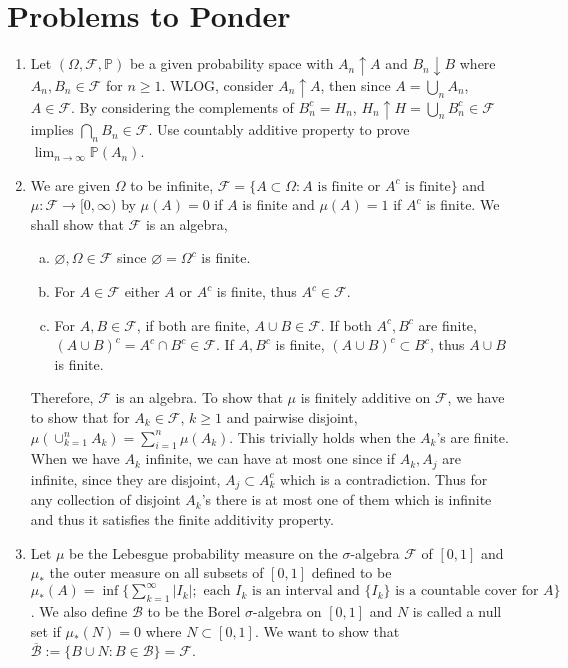 \documentclass[a4paper,10pt]{article}
\theoremstyle{definition}
\begin{document}
\section*{Problems to Ponder}

\begin{enumerate}
\item Let $(\Omega, \mathcal{F}, \mathbb{P})$ be a given probability space with $A_n \uparrow A$ and $B_n \downarrow B$ where $A_n, B_n \in \mathcal{F}$ for $n \geq 1$. WLOG, consider $A_n \uparrow A$, then since $A = \bigcup_nA_n$, $A \in \mathcal{F}$. By considering the complements of $B_n^c = H_n$, $H_n \uparrow H = \bigcup_n B_n^c \in \mathcal{F}$ implies $\bigcap_nB_n \in \mathcal{F}$. Use countably additive property to prove $\lim_{n\to\infty}\mathbb{P}(A_n)$. 

\item We are given $\Omega$ to be infinite, $\mathcal{F} = \{A \subset \Omega: A \text{ is finite or } A^c \text{ is finite}\}$ and $\mu: \mathcal{F}\to [0,\infty)$ by $\mu(A)=0$ if $A$ is finite and $\mu(A) = 1$ if $A^c$ is finite. We shall show that $\mathcal{F}$ is an algebra,
\begin{enumerate}[(a)]
\item $\varnothing, \Omega \in \mathcal{F}$ since $\varnothing = \Omega^c$ is finite. 
\item For $A \in \mathcal{F}$ either $A$ or $A^c$ is finite, thus $A^c \in \mathcal{F}$.
\item For $A, B \in \mathcal{F}$, if both are finite, $A \cup B \in \mathcal{F}$. If both $A^c, B^c$ are finite, $(A \cup B)^c = A^c \cap B^c \in \mathcal{F}$. If $A, B^c$ is finite, $(A \cup B)^c \subset B^c$, thus $A \cup B$ is finite.
\end{enumerate}
Therefore, $\mathcal{F}$ is an algebra. To show that $\mu$ is finitely additive on $\mathcal{F}$, we have to show that for $A_k \in \mathcal{F}$, $k \geq 1$ and pairwise disjoint, $\mu(\cup_{k=1}^nA_k) = \sum_{i=1}^n\mu(A_k)$. This trivially holds when the $A_k$'s are finite. When we have $A_k$ infinite, we can have at most one since if $A_k, A_j$ are infinite, since they are disjoint, $A_j \subset A_k^c$ which is a contradiction. Thus for any collection of disjoint $A_k$'s there is at most one of them which is infinite and thus it satisfies the finite additivity property.

\item Let $\mu$ be the Lebesgue probability measure on the $\sigma$-algebra $\mathcal{F}$ of $[0,1]$ and $\mu_\ast$ the outer measure on all subsets of $[0,1]$ defined to be $\mu_\ast(A)=\inf \{\sum_{k=1}^{\infty}|I_k|; \text{ each }I_k \text{ is an interval and }\{I_k\} \text{ is a countable cover for } A\}$. We also define $\mathcal{B}$ to be the Borel $\sigma$-algebra on $[0,1]$ and $N$ is called a null set if $\mu_\ast(N)=0$ where $N \subset [0,1]$. We want to show that $\overline{\mathcal{B}}:=\{B \cup N: B \in \mathcal{B}\}=\mathcal{F}$.
\end{enumerate}
\end{document}
